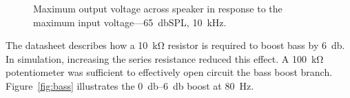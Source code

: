 \documentclass[a4paper,10pt]{article}
\begin{document}
\begin{figure}[h]
	\centering
	\begin{footnotesize}
	\end{footnotesize}
	\caption{Maximum output voltage across speaker in response to the maximum
		input voltage---\SI{65}{\decibel}SPL, \SI{10}{\kilo\hertz}.}
	\label{fig:clipping}
\end{figure}

The datasheet describes how a \SI{10}{\kilo\ohm} resistor is required to boost
bass by \SI{6}{\decibel}. In simulation, increasing the series resistance
reduced this effect. A \SI{100}{\kilo\ohm} potentiometer was sufficient to 
effectively open circuit the bass boost branch. Figure~\ref{fig:bass} illustrates 
the \SIrange{0}{6}{\decibel} boost at \SI{80}{\hertz}.
\end{document}
